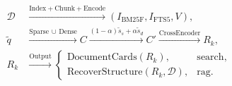 \documentclass[border=4pt]{standalone}
\begin{document}
$\displaystyle
\begin{aligned}
\mathcal D&\xrightarrow{\mathrm{Index+Chunk+Encode}}
(I_{\mathrm{BM25F}},I_{\mathrm{FTS5}},V),\\
\tilde q&\xrightarrow{\mathrm{Sparse}\,\cup\,\mathrm{Dense}}C
\xrightarrow{(1-\alpha)\tilde s_s+\alpha\tilde s_d}C'
\xrightarrow{\mathrm{CrossEncoder}}R_k,\\
R_k&\xrightarrow{\mathrm{Output}}
\begin{cases}
\mathrm{DocumentCards}(R_k),&\mathrm{search},\\
\mathrm{RecoverStructure}(R_k,\mathcal D),&\mathrm{rag}.
\end{cases}
\end{aligned}
$
\end{document}
